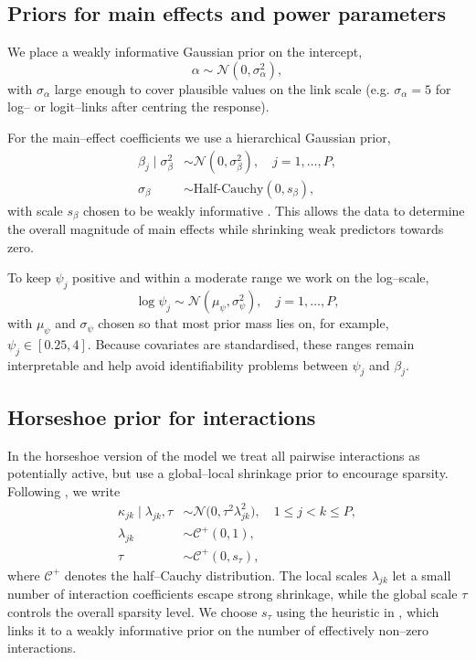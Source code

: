 \documentclass[11pt]{article}
\begin{document}
\begin{doublespacing}
\begin{linenumbers}
\begin{flushleft}
\subsection{Priors for main effects and power parameters}

We place a weakly informative Gaussian prior on the intercept,
\[
  \alpha \sim \mathcal{N}(0,\sigma_\alpha^2),
\]
with $\sigma_\alpha$ large enough to cover plausible values on the link scale (e.g. $\sigma_\alpha = 5$ for log– or logit–links after centring the response).

For the main–effect coefficients we use a hierarchical Gaussian prior,
\begin{align*}
  \beta_j \mid \sigma_\beta^2 &\sim \mathcal{N}(0,\sigma_\beta^2), \quad j=1,\dots,P, \\
  \sigma_\beta &\sim \mathrm{Half\text{-}Cauchy}(0,s_\beta),
\end{align*}
with scale $s_\beta$ chosen to be weakly informative \citep{2014_gelman}. This allows the data to determine the overall magnitude of main effects while shrinking weak predictors towards zero.

To keep $\psi_j$ positive and within a moderate range we work on the log–scale,
\[
  \log \psi_j \sim \mathcal{N}(\mu_\psi,\sigma_\psi^2), \quad j=1,\dots,P,
\]
with $\mu_\psi$ and $\sigma_\psi$ chosen so that most prior mass lies on, for example, $\psi_j \in [0.25,4]$. Because covariates are standardised, these ranges remain interpretable and help avoid identifiability problems between $\psi_j$ and $\beta_j$.

\subsection{Horseshoe prior for interactions}

In the horseshoe version of the model we treat all pairwise interactions as potentially active, but use a global–local shrinkage prior to encourage sparsity. Following \citet{2010_carvalho,2017_piironen}, we write
\begin{align}
  \kappa_{jk} \mid \lambda_{jk},\tau &\sim \mathcal{N}\bigl(0,\tau^2 \lambda_{jk}^2\bigr),
  \quad 1 \le j < k \le P,
  \label{eq:hs-kappa} \\
  \lambda_{jk} &\sim \mathcal{C}^+(0,1), \\
  \tau &\sim \mathcal{C}^+(0,s_\tau),
\end{align}
where $\mathcal{C}^+$ denotes the half–Cauchy distribution. The local scales $\lambda_{jk}$ let a small number of interaction coefficients escape strong shrinkage, while the global scale $\tau$ controls the overall sparsity level. We choose $s_\tau$ using the heuristic in \citet{2017_piironen}, which links it to a weakly informative prior on the number of effectively non–zero interactions.


\end{flushleft}
\end{linenumbers}
\end{doublespacing}
\end{document}
